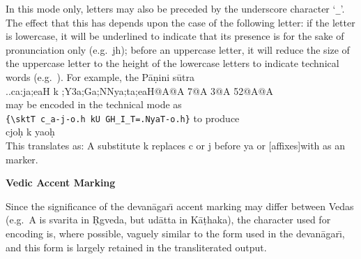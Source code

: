 \documentclass[12pt]{article}
\begin{document}
In this mode only, letters may also be preceded by the underscore character
`\verb+_+'. The effect that this has depends upon the case of the following
letter: if the letter is lowercase, it will be underlined to indicate that
its presence is for the sake of pronunciation only (e.g.~{\sktT jh}\/);
before an uppercase letter, it will reduce the size of the uppercase letter
to the height of the lowercase letters to indicate technical words
(e.g.~{\sktT {}\/}).
For example, the {\skti P\=a\d nini s\=utra\/}\\[2mm]
{\skt ..ca:ja;eaH k ;Y3a;Ga;NNya;ta;eaH@A@A 7@A 3@A 52@A@A}\\[2mm]
may be encoded in the technical mode as\\[3mm]
\verb+{\+\verb+sktT c_a-j-o.h kU GH_I_T=.NyaT-o.h}+ to produce\\[2mm]
{\sktT c\ZN{-}j\ZN{-}o\d h k \ZN{=}ya\ZN{-}o\d h}\\[3mm]
This translates as: A substitute {\sktT k\/} replaces {\sktT c\/} or 
{\sktT j\/} before {\sktT {}ya\/} or [affixes]\newline\hspace*{35mm}with 
{\sktT {}\/} as an {\sktT {}\/} marker.
\vspace{5mm}

\clearpage

{\large \textbf{Vedic Accent Marking}\par}

Since the significance of the {\skti devan\=agar\={\i}} accent marking may
differ between {\skti Veda\/}s (e.g.~{\skt A} is {\skti svarita} in
{\skti \d Rgveda}, but {\skti ud\=atta} in {\skti K\=a\d thaka\/}), the character
used for encoding is, where possible, vaguely similar to the form used in
the {\skti devan\=agar\={\i}}, and this form is largely retained in the 
transliterated output. 
\vspace{\fill}
\end{document}
